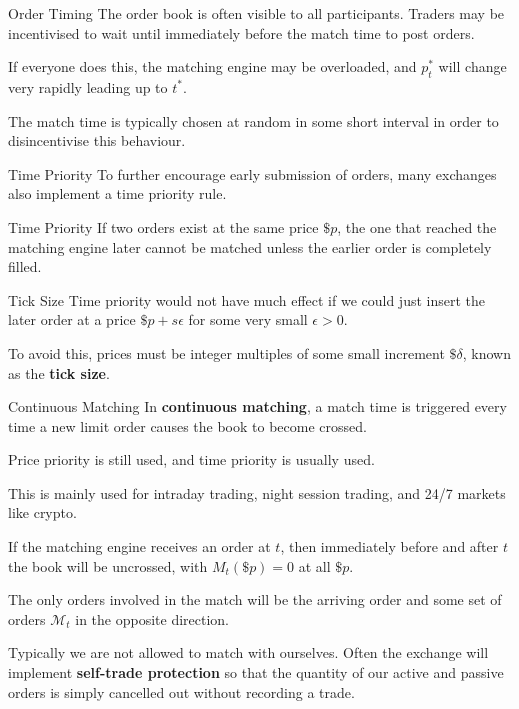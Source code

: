 \documentclass{beamer}
\begin{document}
\begin{frame}{Order Timing}
	The order book is often visible to all participants. Traders may be incentivised to wait until immediately before the match time to post orders.%

	If everyone does this, the matching engine may be overloaded, and $p^*_t$ will change very rapidly leading up to $t^*$.

	\pause

	The match time is typically chosen at random in some short interval in order to disincentivise this behaviour.
\end{frame}

\begin{frame}{Time Priority}
	To further encourage early submission of orders, many exchanges also implement a time priority rule.%
	\begin{block}{Time Priority}
		If two orders exist at the same price $\$p$, the one that reached the matching engine later cannot be matched unless the earlier order is completely filled.
	\end{block}

	\pause

	\begin{block}{Tick Size}
		Time priority would not have much effect if we could just insert the later order at a price $\$p+s\epsilon$ for some very small $\epsilon>0$.%

		To avoid this, prices must be integer multiples of some small increment $\$\delta$, known as the \textbf{tick size}.%
	\end{block}
\end{frame}

\begin{frame}{Continuous Matching}
	In \textbf{continuous matching}, a match time is triggered every time a new limit order causes the book to become crossed.

	Price priority is still used, and time priority is usually used.

	This is mainly used for intraday trading, night session trading, and 24/7 markets like crypto.

	If the matching engine receives an order at $t$, then immediately before and after $t$ the book will be uncrossed, with $M_t(\$p)=0$ at all $\$p$.

	\pause

	The only orders involved in the match will be the arriving order and some set of orders $\mathcal{M}_t$ in the opposite direction.

	Typically we are not allowed to match with ourselves. Often the exchange will implement \textbf{self-trade protection} so that the quantity of our active and passive orders is simply cancelled out without recording a trade.
\end{frame}
\end{document}
